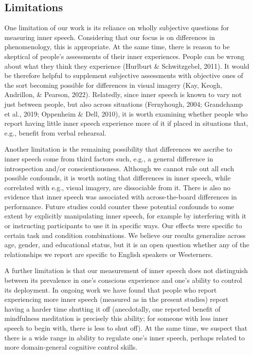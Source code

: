\documentclass[
  man,a4paper,floatsintext]{apa6}
\begin{document}
\hypertarget{limitations}{%
\subsection{Limitations}\label{limitations}}

One limitation of our work is its reliance on wholly subjective questions for measuring inner speech. Considering that our focus is on differences in phenomenology, this is appropriate. At the same time, there is reason to be skeptical of people's assessments of their inner experiences. People can be wrong about what they think they experience (Hurlburt \& Schwitzgebel, 2011). It would be therefore helpful to supplement subjective assessments with objective ones of the sort becoming possible for differences in visual imagery (Kay, Keogh, Andrillon, \& Pearson, 2022). Relatedly, since inner speech is known to vary not just between people, but also across situations (Fernyhough, 2004; Grandchamp et al., 2019; Oppenheim \& Dell, 2010), it is worth examining whether people who report having little inner speech experience more of it if placed in situations that, e.g., benefit from verbal rehearsal.

Another limitation is the remaining possibility that differences we ascribe to inner speech come from third factors such, e.g., a general difference in introspection and/or conscientiousness. Although we cannot rule out all such possible confounds, it is worth noting that differences in inner speech, while correlated with e.g., visual imagery, are dissociable from it. There is also no evidence that inner speech was associated with across-the-board differences in performance. Future studies could counter these potential confounds to some extent by explicitly manipulating inner speech, for example by interfering with it or instructing participants to use it in specific ways. Our effects were specific to certain task and condition combinations. We believe our results generalize across age, gender, and educational status, but it is an open question whether any of the relationships we report are specific to English speakers or Westerners.

A further limitation is that our measurement of inner speech does not distinguish between its prevalence in one's conscious experience and one's ability to control its deployment. In ongoing work we have found that people who report experiencing more inner speech (measured as in the present studies) report having a harder time shutting it off (anecdotally, one reported benefit of mindfulness meditation is precisely this ability; for someone with less inner speech to begin with, there is less to shut off). At the same time, we suspect that there is a wide range in ability to regulate one's inner speech, perhaps related to more domain-general cognitive control skills.
\end{document}
